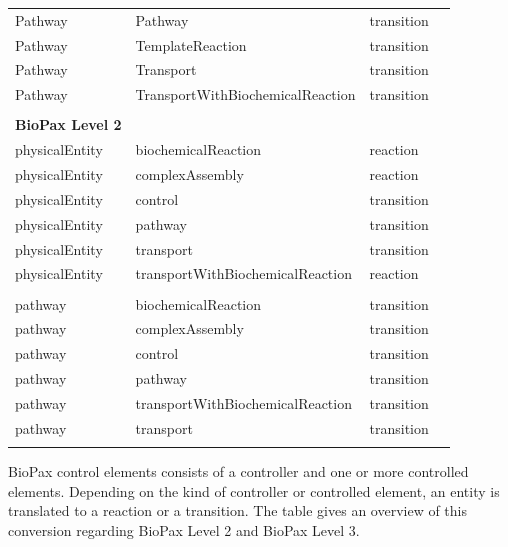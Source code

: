 \documentclass{bioinfo}
\begin{document}
\begin{methods}
\begin{table}[!t]
{\begin{tabular}{llll}
Pathway         & Pathway                           & transition\\
Pathway         & TemplateReaction                  & transition\\
Pathway         & Transport                         & transition\\
Pathway         & TransportWithBiochemicalReaction  & transition\\
\\\midrule
\textbf{BioPax Level 2}\\
\midrule
physicalEntity & biochemicalReaction                & reaction\\
physicalEntity & complexAssembly                    & reaction\\
physicalEntity & control                            & transition\\
physicalEntity & pathway                            & transition\\
physicalEntity & transport                          & transition\\
physicalEntity & transportWithBiochemicalReaction   & reaction\\
\\
pathway         & biochemicalReaction               & transition\\
pathway         & complexAssembly                   & transition\\
pathway         & control                           & transition\\
pathway         & pathway                           & transition\\
pathway         & transportWithBiochemicalReaction  & transition\\
pathway         & transport                         & transition\\\botrule
\end{tabular}}{BioPax control elements consists of a controller and one or more controlled elements. Depending on the kind of controller or controlled element, an entity is translated to a reaction or a transition. The table gives an overview of this conversion regarding BioPax Level 2 and BioPax Level 3.}
\end{table}




\end{methods}
\end{document}
